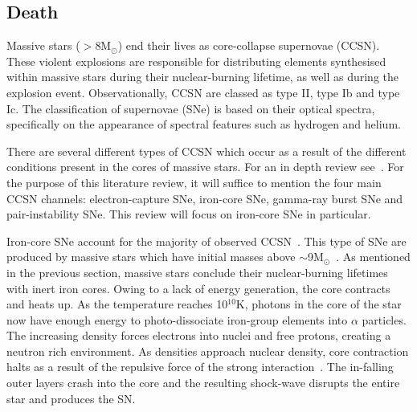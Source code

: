 






\subsection{Death} %
\label{sub:death}

Massive stars ($>$8M$_{\odot}$) end their lives as core-collapse supernovae (CCSN).
These violent explosions are responsible for distributing elements synthesised within massive stars during their nuclear-burning lifetime, as well as during the explosion event.
Observationally, CCSN are classed as type II, type Ib and type Ic.\footnotemark
{}
The classification of supernovae (SNe) is based on their optical spectra, specifically on the appearance of spectral features such as hydrogen and helium.

There are several different types of CCSN which occur as a result of the different conditions present in the cores of massive stars.
For an in depth review see~\cite{Janka12}.
For the purpose of this literature review, it will suffice to mention the four main CCSN channels: electron-capture SNe, iron-core SNe, gamma-ray burst SNe and pair-instability SNe.
This review will focus on iron-core SNe in particular.

Iron-core SNe account for the majority of observed CCSN~\citep{Smartt09,Janka12,Eldridge13}.
This type of SNe are produced by massive stars which have initial masses above $\sim$9M$_{\odot}$~\citep{Poelarends08}.
As mentioned in the previous section, massive stars conclude their nuclear-burning lifetimes with inert iron cores.
Owing to a lack of energy generation, the core contracts and heats up.
As the temperature reaches 10$^{10}$K, photons in the core of the star now have enough energy to photo-dissociate iron-group elements into $\alpha$ particles.
The increasing density forces electrons into nuclei and free protons, creating a neutron rich environment.
As densities approach nuclear density, core contraction halts as a result of the repulsive force of the strong interaction~\citep{Janka12}.
The in-falling outer layers crash into the core and the resulting shock-wave disrupts the entire star and produces the SN.

